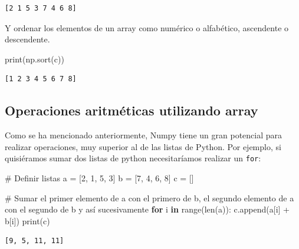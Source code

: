 \documentclass[
  letterpaper,
  DIV=11,
  numbers=noendperiod]{scrreprt}
\newenvironment{Shaded}{\begin{snugshade}}{\end{snugshade}}
\newcommand{\BuiltInTok}[1]{\textcolor[rgb]{0.00,0.23,0.31}{#1}}
\newcommand{\CommentTok}[1]{\textcolor[rgb]{0.37,0.37,0.37}{#1}}
\newcommand{\ControlFlowTok}[1]{\textcolor[rgb]{0.00,0.23,0.31}{\textbf{#1}}}
\newcommand{\DecValTok}[1]{\textcolor[rgb]{0.68,0.00,0.00}{#1}}
\newcommand{\KeywordTok}[1]{\textcolor[rgb]{0.00,0.23,0.31}{\textbf{#1}}}
\newcommand{\NormalTok}[1]{\textcolor[rgb]{0.00,0.23,0.31}{#1}}
\newcommand{\OperatorTok}[1]{\textcolor[rgb]{0.37,0.37,0.37}{#1}}
\begin{document}
\begin{verbatim}
[2 1 5 3 7 4 6 8]
\end{verbatim}

Y ordenar los elementos de un array como numérico o alfabético,
ascendente o descendente.

\begin{Shaded}
\begin{Highlighting}[]
\BuiltInTok{print}\NormalTok{(np.sort(c))}
\end{Highlighting}
\end{Shaded}

\begin{verbatim}
[1 2 3 4 5 6 7 8]
\end{verbatim}

\subsection{\texorpdfstring{Operaciones aritméticas utilizando
\textbf{array}}{Operaciones aritméticas utilizando array}}\label{operaciones-aritmuxe9ticas-utilizando-array}

Como se ha mencionado anteriormente, Numpy tiene un gran potencial para
realizar operaciones, muy superior al de las listas de Python. Por
ejemplo, si quisiéramos sumar dos listas de python necesitaríamos
realizar un \texttt{for}:

\begin{Shaded}
\begin{Highlighting}[]
\CommentTok{\# Definir listas}
\NormalTok{a }\OperatorTok{=}\NormalTok{ [}\DecValTok{2}\NormalTok{, }\DecValTok{1}\NormalTok{, }\DecValTok{5}\NormalTok{, }\DecValTok{3}\NormalTok{]}
\NormalTok{b }\OperatorTok{=}\NormalTok{ [}\DecValTok{7}\NormalTok{, }\DecValTok{4}\NormalTok{, }\DecValTok{6}\NormalTok{, }\DecValTok{8}\NormalTok{]}
\NormalTok{c }\OperatorTok{=}\NormalTok{ []}

\CommentTok{\# Sumar el primer elemento de a con el primero de b, el segundo elemento de a con el segundo de b y así sucesivamente}
\ControlFlowTok{for}\NormalTok{ i }\KeywordTok{in} \BuiltInTok{range}\NormalTok{(}\BuiltInTok{len}\NormalTok{(a)):}
\NormalTok{  c.append(a[i] }\OperatorTok{+}\NormalTok{ b[i])}
\BuiltInTok{print}\NormalTok{(c)}
\end{Highlighting}
\end{Shaded}

\begin{verbatim}
[9, 5, 11, 11]
\end{verbatim}
\end{document}

